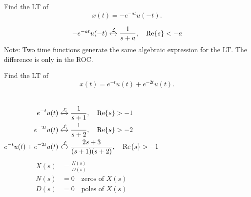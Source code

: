 \begin{frame}[t,allowframebreaks]{}
    \begin{example}
        Find the LT of
        \begin{equation*}
            x(t) = -e^{-at}u(-t).
        \end{equation*}
    \end{example}

    {
            \begin{equation*}
                -e^{-at}u(-t) \xleftrightarrow{\mathcal{L}}   \frac{1}{s+a}, \quad \mathrm{Re}\{s\} < -a
            \end{equation*}
        Note: Two time functions generate the same algebraic expression for the LT. The difference is only in the ROC.
    }

\end{frame}

\begin{frame}[t]{}
    \begin{example}
        Find the LT of
        \begin{equation*}
            x(t) = e^{-t}u(t)+ e^{-2t}u(t).
        \end{equation*}
    \end{example}

    {


            \begin{columns}[t]
                    \begin{align*}
                        e^{-t}u(t) &\xleftrightarrow{\mathcal{L}}   \frac{1}{s+1}, \quad \mathrm{Re}\{s\} > -1\\
                        e^{-2t}u(t) &\xleftrightarrow{\mathcal{L}}   \frac{1}{s+2}, \quad \mathrm{Re}\{s\} > -2\\
                        e^{-t}u(t)+ e^{-2t}u(t) &\xleftrightarrow{\mathcal{L}}   \frac{2s+3}{(s+1)(s+2)}, \quad \mathrm{Re}\{s\} > -1
                    \end{align*}
                    \begin{align*}
                        X(s) &= \frac{N(s)}{D(s)}\\
                        N(s) &= 0\quad \text{zeros of } X(s)\\
                        D(s) &= 0\quad \text{poles of } X(s)
                    \end{align*}

                    
            \end{columns}
    }
\end{frame}


